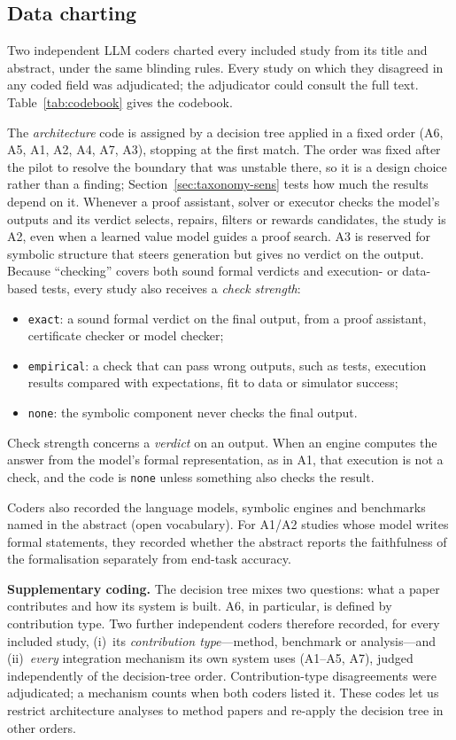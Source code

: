 \subsection{Data charting}
\label{sec:method-coding}
Two independent LLM coders charted every included study from its title and abstract, under the same blinding rules. Every study on which they disagreed in any coded field was adjudicated; the adjudicator could consult the full text. Table~\ref{tab:codebook} gives the codebook.

The \emph{architecture} code is assigned by a decision tree applied in a fixed order (A6, A5, A1, A2, A4, A7, A3), stopping at the first match. The order was fixed after the pilot to resolve the boundary that was unstable there, so it is a design choice rather than a finding; Section~\ref{sec:taxonomy-sens} tests how much the results depend on it. Whenever a proof assistant, solver or executor checks the model's outputs and its verdict selects, repairs, filters or rewards candidates, the study is A2, even when a learned value model guides a proof search. A3 is reserved for symbolic structure that steers generation but gives no verdict on the output. Because ``checking'' covers both sound formal verdicts and execution- or data-based tests, every study also receives a \emph{check strength}:
\begin{itemize}
  \item \texttt{exact}: a sound formal verdict on the final output, from a proof assistant, certificate checker or model checker;
  \item \texttt{empirical}: a check that can pass wrong outputs, such as tests, execution results compared with expectations, fit to data or simulator success;
  \item \texttt{none}: the symbolic component never checks the final output.
\end{itemize}
Check strength concerns a \emph{verdict} on an output. When an engine computes the answer from the model's formal representation, as in A1, that execution is not a check, and the code is \texttt{none} unless something also checks the result.

Coders also recorded the language models, symbolic engines and benchmarks named in the abstract (open vocabulary). For A1/A2 studies whose model writes formal statements, they recorded whether the abstract reports the faithfulness of the formalisation separately from end-task accuracy.

\textbf{Supplementary coding.} The decision tree mixes two questions: what a paper contributes and how its system is built. A6, in particular, is defined by contribution type. Two further independent coders therefore recorded, for every included study, (i)~its \emph{contribution type}---method, benchmark or analysis---and (ii)~\emph{every} integration mechanism its own system uses (A1--A5, A7), judged independently of the decision-tree order. Contribution-type disagreements were adjudicated; a mechanism counts when both coders listed it. These codes let us restrict architecture analyses to method papers and re-apply the decision tree in other orders.

